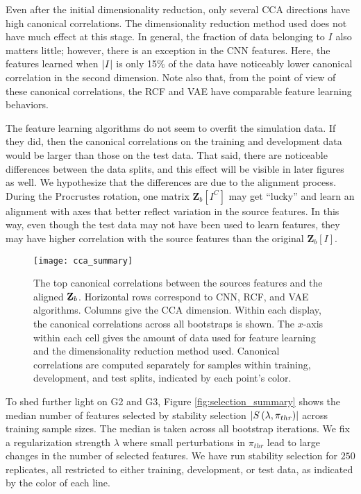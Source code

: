 Even after the initial dimensionality reduction, only several CCA directions
have high canonical correlations. The dimensionality reduction method used does
not have much effect at this stage. In general, the fraction of data belonging
to $I$ also matters little; however, there is an exception in the CNN features.
Here, the features learned when $\left|I\right|$ is only 15\% of the data have
noticeably lower canonical correlation in the second dimension. Note also that,
from the point of view of these canonical correlations, the RCF and VAE have
comparable feature learning behaviors.

The feature learning algorithms do not seem to overfit the simulation data. If
they did, then the canonical correlations on the training and development data
would be larger than those on the test data. That said, there are noticeable
differences between the data splits, and this effect will be visible in later
figures as well. We hypothesize that the differences are due to the alignment
process. During the Procrustes rotation, one matrix
$\mathbf{Z}_{b}\left[I^{C}\right]$ may get ``lucky'' and learn an alignment with
axes that better reflect variation in the source features. In this way, even
though the test data may not have been used to learn features, they may have
higher correlation with the source features than the original
$\mathbf{Z}_{b}\left[I\right]$.

\begin{figure}
  \centering
  \texttt{[image: cca\_summary]}
  \caption{The top canonical correlations between the sources features and the
    aligned $\protect\underaccent{\bar}{\mathbf{Z}}_{b}$. Horizontal rows
    correspond to CNN, RCF, and VAE algorithms. Columns give the CCA dimension.
    Within each display, the canonical correlations across all bootstraps is
    shown. The $x$-axis within each cell gives the amount of data used for
    feature learning and the dimensionality reduction method used. Canonical
    correlations are computed separately for samples within training,
    development, and test splits, indicated by each point's color.}
  \label{fig:cca_summary}
\end{figure}

To shed further light on G2 and G3, Figure \ref{fig:selection_summary} shows
the median number of features selected by stability selection
$\left|S\left(\lambda, \pi_{thr}\right)\right|$ across training sample sizes. The
median is taken across all bootstrap iterations. We fix a regularization
strength $\lambda$ where small perturbations in $\pi_{thr}$ lead to large
changes in the number of selected features. We have run stability selection for
$250$ replicates, all restricted to either training, development, or test data,
as indicated by the color of each line.

